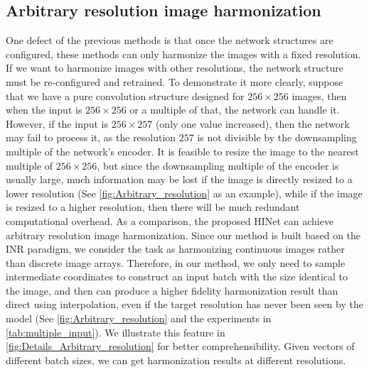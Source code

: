 \documentclass[10pt,journal,twocolumn,twoside]{IEEEtran}
\begin{document}
\subsection{Arbitrary resolution image harmonization}
One defect of the previous methods \cite{guo2021intrinsic, hang2022scs} is that once the network structures are configured, these methods can only harmonize the images with a fixed resolution. If we want to harmonize images with other resolutions, the network structure must be re-configured and retrained. To demonstrate it more clearly, suppose that we have a pure convolution structure designed for $256\times 256$ images, then when the input is $256\times 256$ or a multiple of that, the network can handle it. However, if the input is \eg $256\times 257$ (only one value increased), then the network may fail to process it, as the resolution $257$ is not divisible by the downsampling multiple of the network's encoder. It is feasible to resize the image to the nearest multiple of $256\times 256$, but since the downsampling multiple of the encoder is usually large\cite{sofiiuk2021foreground}, much information may be lost if the image is directly resized to a lower resolution (See \cref{fig:Arbitrary_resolution} as an example), while if the image is resized to a higher resolution, then there will be much redundant computational overhead. As a comparison, the proposed HINet can achieve arbitrary resolution image harmonization. Since our method is built based on the INR paradigm, we consider the task as harmonizing continuous images rather than discrete image arrays. Therefore, in our method, we only need to sample intermediate coordinates to construct an input batch with the size identical to the image, and then can produce a higher fidelity harmonization result than direct using interpolation, even if the target resolution has never been seen by the model (See \cref{fig:Arbitrary_resolution} and the experiments in \cref{tab:multiple_input}). We illustrate this feature in \cref{fig:Details_Arbitrary_resolution} for better comprehensibility. Given vectors of different batch sizes, we can get harmonization results at different resolutions.
\end{document}
